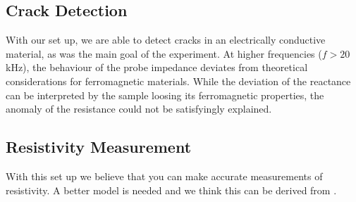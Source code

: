 \subsection{Crack Detection}
With our set up, we are able to detect cracks in an electrically conductive material, as was the main goal of the experiment. At higher frequencies ($f>20$ kHz), the behaviour of the probe impedance deviates from theoretical considerations for ferromagnetic materials. While the deviation of the reactance can be interpreted by the sample loosing its ferromagnetic properties, the anomaly of the resistance could not be satisfyingly explained.
\par
\subsection{Resistivity Measurement}
With this set up we believe that you can make accurate measurements of resistivity. A better model is needed
and we think this can be derived from \cite{deedsdodd}.